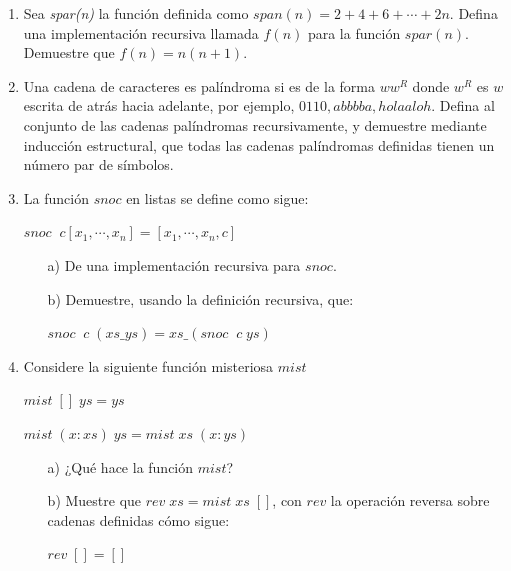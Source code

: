 \documentclass[letterpaper,11pt]{article}
\begin{document}
\begin{enumerate}
    \item Sea \textit{spar(n)} la función definida como $span(n) = 2 + 4 + 6 +
    ⋯ + 2n$. Defina una implementación recursiva llamada $f(n)$ para la función 
    $spar(n)$. Demuestre que $f(n) = n(n + 1)$.

    \item Una cadena de caracteres es palíndroma si es de la forma $ww^{R}$ 
    donde $w^{R}$ es $w$ escrita de atrás hacia adelante, por ejemplo, $0110,
    abbbba, holaaloh$. Defina al conjunto de las cadenas palíndromas 
    recursivamente, y demuestre mediante inducción estructural, que todas las 
    cadenas palíndromas definidas tienen un número par de símbolos. 

    \item La función $snoc$ en listas se define como sigue:
    \begin{center}
        $snoc \; \; c[x_{1}, ⋯, x_{n}] = [x_{1}, ⋯, x_{n}, c]$
    \end{center}

    \begin{itemize}
        \item[a)] De una implementación recursiva para $snoc$.
        \item[b)] Demuestre, usando la definición recursiva, que:
        \begin{center}
            $snoc \; \; c \; (xs\_ys) = xs\_ (snoc \; \; c \; ys)$
        \end{center} 
    \end{itemize}

    \item Considere la siguiente función misteriosa $mist$
    \begin{center}
        $mist \; [] \; ys = ys$

        $mist \; (x : xs) \;  ys = mist \; xs \; (x : ys)$
    \end{center}

    \begin{itemize}
        \item[a)] ¿Qué hace la función $mist$?
        \item[b)] Muestre que $rev \; xs = mist \; xs \; []$, con $rev$ la 
        operación reversa sobre cadenas definidas cómo sigue: 
        \begin{center}
            $rev \; [] = []$


\end{center}
\end{itemize}
\end{enumerate}
\end{document}
